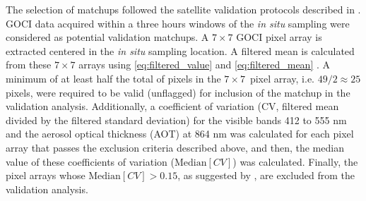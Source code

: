 \documentclass[onecolumn,3p,letterpaper,11pt]{elsarticle}
\begin{document}
The selection of matchups followed the satellite validation protocols described in \citet{Bailey2006}. GOCI data acquired within a three hours windows of the {\it in situ} sampling were considered as potential validation matchups. A $7\times7$ GOCI pixel array is extracted centered in the {\it in situ} sampling location. A filtered mean is calculated from these $7\times7$ arrays using \autoref{eq:filtered_value} and \autoref{eq:filtered_mean} \citep{Bailey2006}. A minimum of at least half the total of pixels in the $7\times7$~pixel array, i.e. $49/2\approx25$ pixels, were required to be valid (unflagged) for inclusion of the matchup in the validation analysis. Additionally, a coefficient of variation (CV, filtered mean divided by the filtered standard deviation) for the visible bands 412 to 555 nm and the aerosol optical thickness (AOT) at 864 nm was calculated for each pixel array that passes the exclusion criteria described above, and then, the median value of these coefficients of variation ($\text{Median}[CV]$) was calculated. Finally, the pixel arrays whose $\text{Median}[CV]>0.15$, as suggested by \citep{Bailey2006}, are excluded from the validation analysis.
\end{document}
